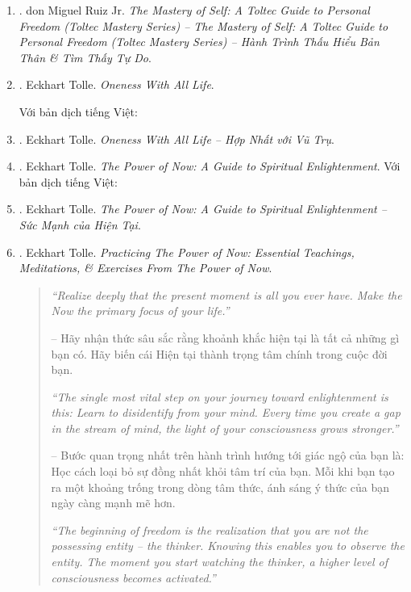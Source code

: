 \documentclass[12pt]{article}
\begin{document}
\begin{enumerate}
\begin{quotation}
		{\it``This is what resentment is: self-inflicted suffering with the emotional poison we wish for another.''}
		
		-- Đây chính là sự oán giận: sự đau khổ tự gây ra bằng chất độc cảm xúc mà chúng ta mong muốn cho người khác.
	\end{quotation}
	Với bản dịch tiếng Việt:
	\item \cite{Ruiz_mastery_self}. {\sc don Miguel Ruiz Jr.} {\it The Mastery of Self: A Toltec Guide to Personal Freedom (Toltec Mastery Series) -- The Mastery of Self: A Toltec Guide to Personal Freedom (Toltec Mastery Series) -- Hành Trình Thấu Hiểu Bản Thân \& Tìm Thấy Tự Do}.
	\item \cite{Tolle_oneness}. {\sc Eckhart Tolle}. {\it Oneness With All Life}.
	
	Với bản dịch tiếng Việt:
	\item \cite{Tolle_oneness_VN}. {\sc Eckhart Tolle}. {\it Oneness With All Life -- Hợp Nhất với Vũ Trụ}.
	\item \cite{Tolle_now}. {\sc Eckhart Tolle}. {\it The Power of Now: A Guide to Spiritual Enlightenment}. Với bản dịch tiếng Việt:
	\item \cite{Tolle_now_VN}. {\sc Eckhart Tolle}. {\it The Power of Now: A Guide to Spiritual Enlightenment -- Sức Mạnh của Hiện Tại}.
	\item \cite{Tolle_practice_now}. {\sc Eckhart Tolle}. {\it Practicing The Power of Now: Essential Teachings, Meditations, \& Exercises From The Power of Now}.
	\begin{quotation}
		{\it``Realize deeply that the present moment is all you ever have. Make the Now the primary focus of your life.''}
		
		-- Hãy nhận thức sâu sắc rằng khoảnh khắc hiện tại là tất cả những gì bạn có. Hãy biến cái Hiện tại thành trọng tâm chính trong cuộc đời bạn.
		
		{\it``The single most vital step on your journey toward enlightenment is this: Learn to disidentify from your mind. Every time you create a gap in the stream of mind, the light of your consciousness grows stronger.''}
		
		-- Bước quan trọng nhất trên hành trình hướng tới giác ngộ của bạn là: Học cách loại bỏ sự đồng nhất khỏi tâm trí của bạn. Mỗi khi bạn tạo ra một khoảng trống trong dòng tâm thức, ánh sáng ý thức của bạn ngày càng mạnh mẽ hơn.
		
		{\it``The beginning of freedom is the realization that you are not the possessing entity -- the thinker. Knowing this enables you to observe the entity. The moment you start watching the thinker, a higher level of consciousness becomes activated.''}
		

\end{quotation}
\end{enumerate}
\end{document}
